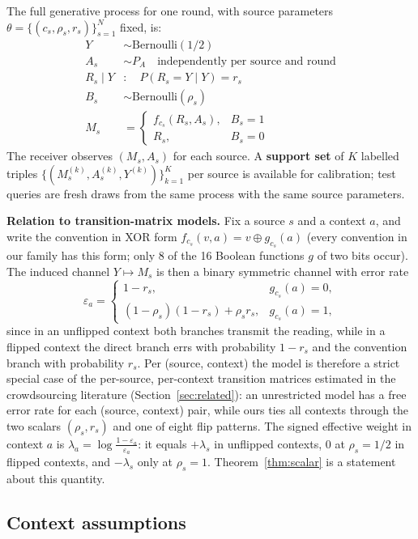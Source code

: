 The full generative process for one round, with source parameters
$\theta = \{(c_s, \rho_s, r_s)\}_{s=1}^N$ fixed, is:
\begin{align}
Y &\sim \mathrm{Bernoulli}(1/2) \\
A_s &\sim P_A \quad \text{independently per source and round} \\
R_s \mid Y & : \quad P(R_s = Y \mid Y) = r_s \\
B_s &\sim \mathrm{Bernoulli}(\rho_s) \\
M_s &= \begin{cases} f_{c_s}(R_s, A_s), & B_s = 1 \\ R_s, & B_s = 0 \end{cases}
\end{align}
The receiver observes $(M_s, A_s)$ for each source. A \textbf{support set}
of $K$ labelled triples $\{(M_s^{(k)}, A_s^{(k)}, Y^{(k)})\}_{k=1}^K$ per
source is available for calibration; test queries are fresh draws from the
same process with the same source parameters.

\textbf{Relation to transition-matrix models.} Fix a source $s$ and a
context $a$, and write the convention in XOR form
$f_{c_s}(v,a) = v \oplus g_{c_s}(a)$ (every convention in our family has
this form; only 8 of the 16 Boolean functions $g$ of two bits occur). The
induced channel $Y \mapsto M_s$ is then a binary symmetric channel with
error rate
\[
\varepsilon_a = \begin{cases} 1 - r_s, & g_{c_s}(a) = 0, \\
(1-\rho_s)(1-r_s) + \rho_s r_s, & g_{c_s}(a) = 1, \end{cases}
\]
since in an unflipped context both branches transmit the reading, while in
a flipped context the direct branch errs with probability $1-r_s$ and the
convention branch with probability $r_s$. Per (source, context) the model
is therefore a strict special case of the per-source, per-context
transition matrices estimated in the crowdsourcing literature
(Section~\ref{sec:related}): an unrestricted model has a free error rate
for each (source, context) pair, while ours ties all contexts through the
two scalars $(\rho_s, r_s)$ and one of eight flip patterns. The signed
effective weight in context $a$ is
$\lambda_a = \log\frac{1-\varepsilon_a}{\varepsilon_a}$: it equals
$+\lambda_s$ in unflipped contexts, $0$ at $\rho_s = 1/2$ in flipped
contexts, and $-\lambda_s$ only at $\rho_s = 1$.
Theorem~\ref{thm:scalar} is a statement about this quantity.

\subsection{Context assumptions}

